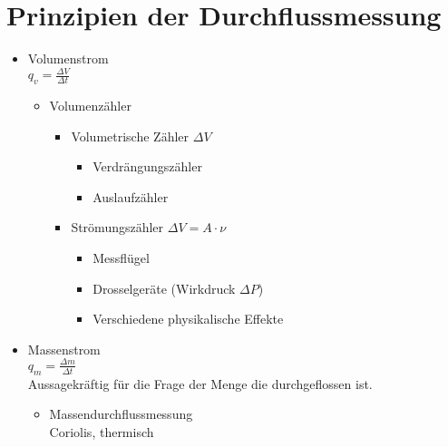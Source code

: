 \documentclass{scrreprt}
\begin{document}
\section{Prinzipien der Durchflussmessung}
\begin{itemize}
\item Volumenstrom\\
$q_v= \frac{\Delta V}{\Delta t}$
\begin{itemize}
\item Volumenzähler
\begin{itemize}
\item Volumetrische Zähler $\Delta V$
\begin{itemize}
\item Verdrängungszähler
\item Auslaufzähler
\end{itemize}
\item Strömungszähler $\Delta V = A \cdot \nu$
\begin{itemize}
\item Messflügel
\item Drosselgeräte (Wirkdruck $\Delta P$)
\item Verschiedene physikalische Effekte
\end{itemize}
\end{itemize}
\end{itemize}
\item Massenstrom\\
$q_m = \frac{\Delta m}{\Delta t}$\\
Aussagekräftig für die Frage der Menge die durchgeflossen ist.
\begin{itemize}
\item Massendurchflussmessung\\
Coriolis, thermisch
\end{itemize}
\end{itemize}
\end{document}
